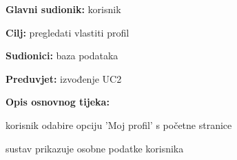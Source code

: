                     
                    \noindent {}
					\begin{packed_item}
	
						\item \textbf{Glavni sudionik: }korisnik
						\item  \textbf{Cilj:} pregledati vlastiti profil
						\item  \textbf{Sudionici:} baza podataka
						\item  \textbf{Preduvjet:} izvođenje UC2
						\item  \textbf{Opis osnovnog tijeka:}
						
						\item[] \begin{packed_enum}
	
							\item korisnik odabire opciju 'Moj profil' s početne stranice
							\item sustav prikazuje osobne podatke korisnika 
			
						\end{packed_enum}
						
						
					\end{packed_item}

